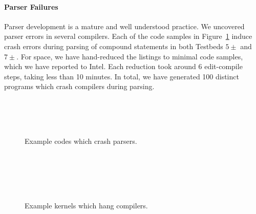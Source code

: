 
\paragraph{Parser Failures} %
Parser development is a mature and well understood practice. We uncovered parser errors in several compilers. Each of the code samples in Figure~\ref{lst:parser-crashes} induce crash errors during parsing of compound statements in both Testbeds $5\pm$ and $7\pm$. For space, we have hand-reduced the listings to minimal code samples, which we have reported to Intel. Each reduction took around 6 edit-compile steps, taking less than 10 minutes. In total, we have generated 100 distinct programs which crash compilers during parsing.

\begin{figure}
  \centering %
  \\%
  \\%
  \\%
  \caption{Example codes which crash parsers.}%
  \label{lst:parser-crashes}%
\end{figure}

\begin{figure}
  \centering %
  \\%
  \\%
  \\%
  \\%
  \caption{Example kernels which hang compilers.}%
  \label{lst:compiler-hangs}%
\end{figure}


